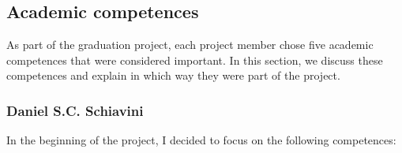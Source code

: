 
\subsection{Academic competences}
\label{assessment:competences}
As part of the graduation project, each project member chose five academic competences that were considered important.
In this section, we discuss these competences and explain in which way they were part of the project.

\subsubsection{Daniel S.C. Schiavini}
In the beginning of the project, I decided to focus on the following competences:

